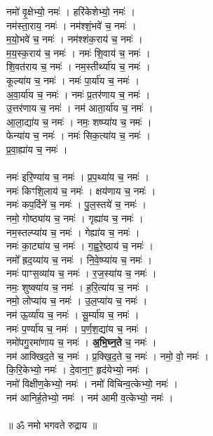नमो॑ वृ॒क्षेभ्यो॒ नमः॑ । हरि॑केशेभ्यो॒ नमः॑ ।\\
नम॑स्ता॒राय॒ नमः॑ । नम॑श्शं॒भवे॑ च॒ नमः॑ ।\\
म॒यो॒भवे॑ च॒ नमः॑ । नम॑श्शंक॒राय॑ च॒ नमः॑ ।\\
म॒य॒स्क॒राय॑ च॒ नमः॑ । नमः॑ शि॒वाय॑  च॒ नमः॑ ।\\
शि॒वत॑राय च॒ नमः॑ । नम॒स्तीर्थ्या॑य च॒ नमः॑ ।\\
कूल्या॑य च॒ नमः॑ । नमः॑ पा॒र्या॑य च॒ नमः॑ ।\\
अ॒वा॒र्या॑य च॒ नमः॑ । नमः॑ प्र॒तर॑णाय च॒ नमः॑ ।\\
उ॒त्तर॑णाय च॒ नमः॑ । नम॑ आता॒र्या॑य च॒ नमः॑ ।\\
आ॒ला॒द्या॑य च॒ नमः॑ । नमः॒ शष्प्या॑य च॒ नमः॑ ।\\
फेन्या॑य च॒ नमः॑ । नमः॑ सिक॒त्या॑य च॒ नमः॑ ।\\
प्र॒वा॒ह्या॑य च॒ नमः॑ ।\\
\\
नमः॑ इरि॒ण्या॑य च॒ नमः॑ । प्र॒प॒थ्या॑य च॒ नमः॑ ।\\
नमः॑ किꣳशि॒लाय॑ च॒ नमः॑ । क्षय॑णाय च॒ नमः॑ ।\\
नमः॑ कप॒र्दिने॑ च॒ नमः॑ । पु॒ल॒स्तये॑ च॒ नमः॑ ।\\
नमो॒ गोष्ठ्या॑य च॒ नमः॑ । गृह्या॑य च॒ नमः॑ ।\\
नम॒स्तल्प्या॑य च॒ नमः॑ । गेह्या॑य च॒ नमः॑ ।\\
नमः॑ का॒ट्या॑य च॒ नमः॑ । ग॒ह्व॒रे॒ष्ठाय॑ च॒ नमः॑ ।\\
नमो᳚ ह्रद॒य्या॑य च॒ नमः॑ । नि॒वे॒ष्प्या॑य च॒ नमः॑ ।\\
नमः॑ पाꣳस॒व्या॑य च॒ नमः॑ । र॒ज॒स्या॑य च॒ नमः॑ ।\\
नमः॒ शुष्क्या॑य च॒ नमः॑ । ह॒रि॒त्या॑य च॒ नमः॑ ।\\
नमो॒ लोप्या॑य च॒ नमः॑ । उ॒ल॒प्या॑य च॒ नमः॑ ।\\
नम॑ ऊ॒र्व्या॑य च॒ नमः॑ । सू॒र्म्या॑य च॒ नमः॑ ।\\
नमः॑ प॒र्ण्या॑य च॒ नमः॑ । प॒र्ण॒श॒द्या॑य च॒ नमः॑ ।\\
नमो॑पगु॒रमा॑णाय च॒ नमः॑ । \textbf{अ॒भि॒घ्न॒ते} च॒ नमः॑ ।\\
नम॑ आक्खिद॒ते च॒ नमः॑ । प्र॒क्खि॒द॒ते च॒ नमः॑ । नमो॒ वो॒ नमः॑ ।\\
कि॒रि॒केभ्यो॒ नमः॑ । दे॒वाना॒ꣳ॒ हृद॑येभ्यो॒ नमः॑ ।\\
नमो॑ विक्षीण॒केभ्यो॒ नमः॑ । नमो॑ विचिन्व॒त्केभ्यो॒ नमः॑ ।\\
नम॑ आनिर्ह॒तेभ्यो॒ नमः॑ । नम॑ आमी व॒त्केभ्यो॒ नमः॑ ।\\
\\
॥ ॐ नमो भगवते रुद्राय ॥\\
